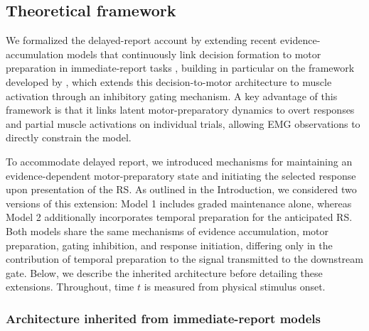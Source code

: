 \documentclass[a4paper,11pt]{article}
\theoremstyle{definition}
\newcommand{\1}{\mathbbm{1}}
\begin{document}
\subsection{Theoretical framework}

We formalized the delayed-report account by extending recent evidence-accumulation models that continuously link decision formation to motor preparation in immediate-report tasks \parencites{balsdonSecondaryMotorIntegration2023}{heitzNeuralMechanismsSpeedAccuracy2012}{verdonckLeakyIntegratingThreshold2021}, building in particular on the framework developed by \textcite{dendauwGatedCascadeDiffusion2024}, which extends this decision-to-motor architecture to muscle activation through an inhibitory gating mechanism. A key advantage of this framework is that it links latent motor-preparatory dynamics to overt responses and partial muscle activations on individual trials, allowing EMG observations to directly constrain the model.

To accommodate delayed report, we introduced mechanisms for maintaining an evidence-dependent motor-preparatory state and initiating the selected response upon presentation of the RS. As outlined in the Introduction, we considered two versions of this extension: Model 1 includes graded maintenance alone, whereas Model 2 additionally incorporates temporal preparation for the anticipated RS. Both models share the same mechanisms of evidence accumulation, motor preparation, gating inhibition, and response initiation, differing only in the contribution of temporal preparation to the signal transmitted to the downstream gate. Below, we describe the inherited architecture before detailing these extensions. Throughout, time $t$ is measured from physical stimulus onset.


\subsubsection{Architecture inherited from immediate-report models}
\end{document}

